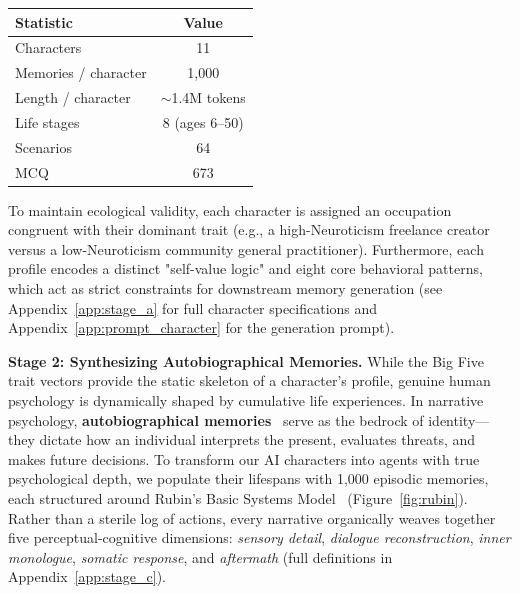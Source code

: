 \documentclass{article}
\newcommand{\ourbench}[0]{\textsc{HEART-Bench}\xspace}
\begin{document}
\begin{table}
\vspace{-12pt}
\centering
\captionof{table}{Statistics of \ourbench.}
\label{tab:dataset_overview}
\small
\begin{tabular}{lc}
\toprule
\textbf{Statistic} & \textbf{Value} \\
\midrule
Characters           & 11 \\
Memories / character & 1{,}000 \\
Length / character   & $\sim$1.4M tokens \\
Life stages          & 8 (ages 6--50) \\
Scenarios            & 64 \\
MCQ                  & 673 \\
\bottomrule
\end{tabular}
\vspace{-10pt}
\end{table}


To maintain ecological validity, each character is assigned an occupation congruent with their dominant trait (e.g., a high-Neuroticism freelance creator versus a low-Neuroticism community general practitioner). Furthermore, each profile encodes a distinct "self-value logic" and eight core behavioral patterns, which act as strict constraints for downstream memory generation (see Appendix~\ref{app:stage_a} for full character specifications and Appendix~\ref{app:prompt_character} for the generation prompt).

\textbf{Stage 2: Synthesizing Autobiographical Memories.}
While the Big Five trait vectors provide the static skeleton of a character's profile, genuine human psychology is dynamically shaped by cumulative life experiences. In narrative psychology, \textbf{autobiographical memories}~\cite{singer1995seeing} serve as the bedrock of identity—they dictate how an individual interprets the present, evaluates threats, and makes future decisions. To transform our AI characters into agents with true psychological depth, we populate their lifespans with 1,000 episodic memories, each structured around Rubin's Basic Systems Model~\cite{rubin2006basic} (Figure~\ref{fig:rubin}). Rather than a sterile log of actions, every narrative organically weaves together five perceptual-cognitive dimensions: \textit{sensory detail}, \textit{dialogue reconstruction}, \textit{inner monologue}, \textit{somatic response}, and \textit{aftermath} (full definitions in Appendix~\ref{app:stage_c}).
\end{document}
